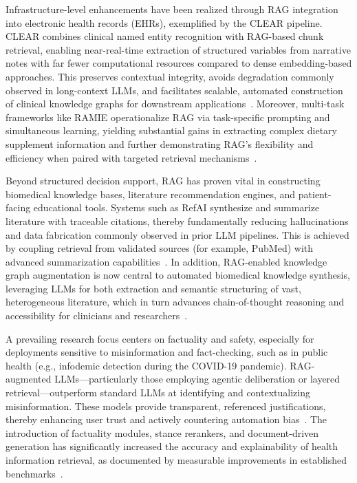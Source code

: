 \documentclass[sigconf]{acmart}
\begin{document}
Infrastructure-level enhancements have been realized through RAG integration into electronic health records (EHRs), exemplified by the CLEAR pipeline. CLEAR combines clinical named entity recognition with RAG-based chunk retrieval, enabling near-real-time extraction of structured variables from narrative notes with far fewer computational resources compared to dense embedding-based approaches. This preserves contextual integrity, avoids degradation commonly observed in long-context LLMs, and facilitates scalable, automated construction of clinical knowledge graphs for downstream applications~\cite{ref3}. Moreover, multi-task frameworks like RAMIE operationalize RAG via task-specific prompting and simultaneous learning, yielding substantial gains in extracting complex dietary supplement information and further demonstrating RAG’s flexibility and efficiency when paired with targeted retrieval mechanisms~\cite{ref8}.

Beyond structured decision support, RAG has proven vital in constructing biomedical knowledge bases, literature recommendation engines, and patient-facing educational tools. Systems such as RefAI synthesize and summarize literature with traceable citations, thereby fundamentally reducing hallucinations and data fabrication commonly observed in prior LLM pipelines. This is achieved by coupling retrieval from validated sources (for example, PubMed) with advanced summarization capabilities~\cite{ref7, ref48}. In addition, RAG-enabled knowledge graph augmentation is now central to automated biomedical knowledge synthesis, leveraging LLMs for both extraction and semantic structuring of vast, heterogeneous literature, which in turn advances chain-of-thought reasoning and accessibility for clinicians and researchers~\cite{ref5, ref31, ref52}.

A prevailing research focus centers on factuality and safety, especially for deployments sensitive to misinformation and fact-checking, such as in public health (e.g., infodemic detection during the COVID-19 pandemic). RAG-augmented LLMs—particularly those employing agentic deliberation or layered retrieval—outperform standard LLMs at identifying and contextualizing misinformation. These models provide transparent, referenced justifications, thereby enhancing user trust and actively countering automation bias~\cite{ref35, ref42, ref49, ref54}. The introduction of factuality modules, stance rerankers, and document-driven generation has significantly increased the accuracy and explainability of health information retrieval, as documented by measurable improvements in established benchmarks~\cite{ref54}.
\end{document}
